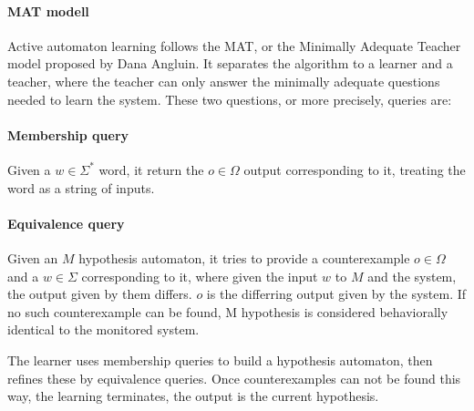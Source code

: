 \paragraph{MAT modell} Active automaton learning follows the MAT, or the Minimally Adequate Teacher model proposed by Dana Angluin\cite{ANGLUIN198787}. It separates the algorithm to a learner and a teacher, where the teacher can only answer the minimally adequate questions needed to learn the system. These two questions, or more precisely, queries are:


\paragraph{Membership query} Given a $w\in\Sigma^{*}$ word, it return the $o\in \Omega$ output corresponding to it, treating the word as a string of inputs.

\paragraph{Equivalence query} Given an $M$ hypothesis automaton, it tries to provide a counterexample $o\in\Omega$ and a $w\in\Sigma$ corresponding to it, where given the input $w$ to $M$ and the system, the output given by them differs. $o$ is the differring output given by the system. If no such counterexample can be found, M hypothesis is considered behaviorally identical to the monitored system.

\noindent The learner uses membership queries to build a hypothesis automaton, then refines these by equivalence queries. Once counterexamples can not be found this way, the learning terminates, the output is the current hypothesis.

